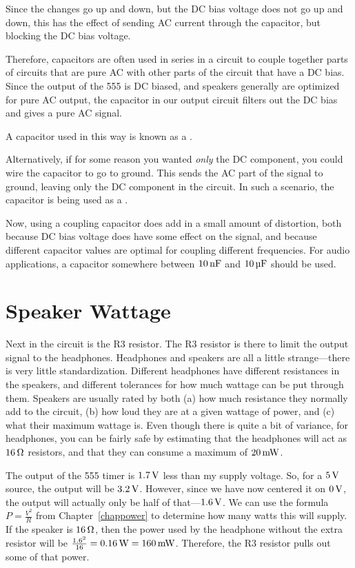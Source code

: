 Since the changes go up and down, but the DC bias voltage does not go up and down, this has the effect of sending AC current through the capacitor, but blocking the DC bias voltage.

Therefore, capacitors are often used in series in a circuit to couple together parts of circuits that are pure AC with other parts of the circuit that have a DC bias.
Since the output of the 555 is DC biased, and speakers generally are optimized for pure AC output, the capacitor in our output circuit filters out the DC bias and gives a pure AC signal.

A capacitor used in this way is known as a .

Alternatively, if for some reason you wanted \emph{only} the DC component, you could wire the capacitor to go to ground.
This sends the AC part of the signal to ground, leaving only the DC component in the circuit.
In such a scenario, the capacitor is being used as a .

Now, using a coupling capacitor does add in a small amount of distortion, both because DC bias voltage does have some effect on the signal, and because different capacitor values are optimal for coupling different frequencies.
For audio applications, a capacitor somewhere between $10\,\si{\nano\farad}$ and $10\,\si{\micro\farad}$ should be used.

\section{Speaker Wattage}

Next in the circuit is the R3 resistor.
The R3 resistor is there to limit the output signal to the headphones.
Headphones and speakers are all a little strange---there is very little standardization.
Different headphones have different resistances in the speakers, and different tolerances for how much wattage can be put through them.
Speakers are usually rated by both (a) how much resistance they normally add to the circuit, (b) how loud they are at a given wattage of power, and (c) what their maximum wattage is.
Even though there is quite a bit of variance, for headphones, you can be fairly safe by estimating that the headphones will act as $16\,\si{\ohm}$ resistors, and that they can consume a maximum of $20\,\si{\milli\watt}$.

The output of the 555 timer is $1.7\,\si{\volt}$ less than my supply voltage.
So, for a $5\,\si{\volt}$ source, the output will be $3.2\,\si{\volt}$. 
However, since we have now centered it on $0\,\si{\volt}$, the output will actually only be half of that---$1.6\,\si{\volt}$.
We can use the formula $P = \frac{V^2}{R}$ from Chapter~\ref{chappower} to determine how many watts this will supply.
If the speaker is $16\,\si{\ohm}$, then the power used by the headphone without the extra resistor will be $\frac{1.6^2}{16} = 0.16\,\si{\watt} = 160\,\si{\milli\watt}$.
Therefore, the R3 resistor pulls out some of that power.

